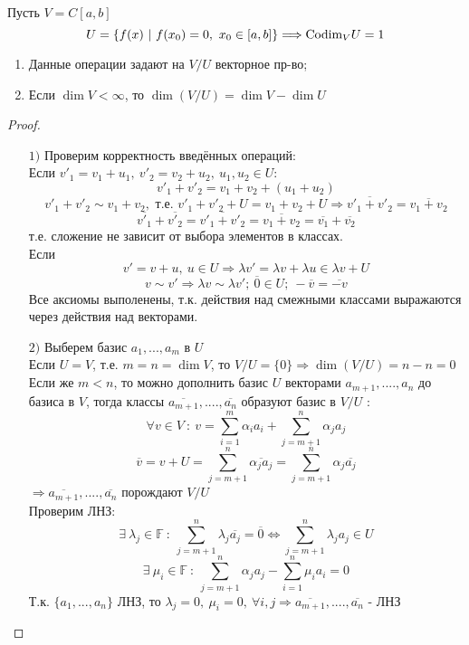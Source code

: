     \begin{example1}
        Пусть $V = C[a, b]$ 
        $$U = \{f(x) \ | \ f(x_0) = 0, \ x_0 \in [a, b]\} \Longrightarrow \textup{Codim}_{V} U = 1$$
    \end{example1}
    \begin{theorem} \tab
        \begin{enumerate}
            \item Данные операции задают на $V/U$ векторное пр-во;
            \item Если $\dim V < \infty$, то $\dim(V/U) = \dim V - \dim U$
        \end{enumerate}
    \end{theorem}
    \begin{proof} \tab
        \begin{itemize}
            \item[$1)$] Проверим корректность введённых операций:\\
            Если $v'_1 = v_1 + u_1, \ v'_2 = v_2 + u_2, \ u_1, u_2\in U: $ 
            $$v'_1 + v'_2 = v_1 + v_2 + (u_1 + u_2)$$
            $$ v'_1 + v'_2 \sim v_1 + v_2, \text{ т.е. } v'_1 + v'_2 + U = v_1 + v_2 + U \Rightarrow \overline{v'_1 + v'_2} = \overline{v_1 + v_2}$$
            $$\overline{v'_1} + \overline{v'_2} = \overline{v'_1 + v'_2} = \overline{v_1 + v_2} = \overline{v_1} + \overline{v_2}$$
            т.е. сложение не зависит от выбора элементов в классах.\\
            Если 
            $$v' = v + u, \ u \in U \Longrightarrow \lambda v' = \lambda v + \lambda u \in \lambda v + U$$ 
            $$v \sim v' \Longrightarrow \lambda v \sim \lambda v'; \ \overline{0} \in U; \  -\overline{v} = \overline{-v}$$
            Все аксиомы выполенены, т.к. действия над смежными классами выражаются через действия над векторами.
            \item[$2)$] Выберем базис $a_1,...,a_m$ в $U$\\
            Если $U=V$, т.е. $m=n=\dim V$, то $V/U = \{0\} \Longrightarrow \dim (V/U) = n-n=0$\\
            Если же $m<n$, то можно дополнить базис $U$ векторами $a_{m+1},....,a_n$ до базиса в $V$, тогда классы $\overline{a_{m+1}},....,\overline{a_n}$ образуют базис в $V/U$ :
            $$\forall v \in V \ : \ v = \sum \limits_{i=1}^m \alpha_i a_i + \sum \limits_{j=m+1}^n \alpha_j a_j$$
            $$\overline{v} = v+ U = \sum \limits_{j=m+1}^n \overline{\alpha_j a_j} = \sum \limits_{j=m+1}^n \alpha_j \overline{ a_j}$$
            $\Longrightarrow \overline{a_{m+1}},....,\overline{a_n}$ порождают $V/U$\\
            Проверим ЛНЗ: 
            $$\exists \ \lambda_j \in \mathbb{F} \ : \ \sum \limits_{j=m+1}^n \lambda_j \overline{ a_j} = \overline{0} \Longleftrightarrow  \sum \limits_{j=m+1}^n \lambda_j a_j \in U$$
            $$\exists \ \mu_i \in \mathbb{F} \ : \ \sum \limits_{j=m+1}^n \alpha_j a_j - \sum \limits_{i=1}^n \mu_i a_i = 0$$
            Т.к. $\{a_1,...,a_n\}$ ЛНЗ, то $\lambda_j =0, \ \mu_i =0 , \ \forall i,j \Longrightarrow \overline{a_{m+1}},....,\overline{a_n}$ - ЛНЗ   
        \end{itemize}
    \end{proof}